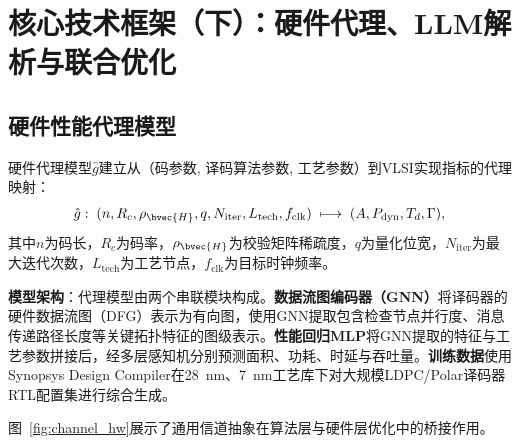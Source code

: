 ﻿\section{核心技术框架（下）：硬件代理、LLM解析与联合优化}\label{sec:framework_b}

\subsection{硬件性能代理模型}\label{sec:hw_proxy}

硬件代理模型$\hat{g}$建立从（码参数, 译码算法参数, 工艺参数）到VLSI实现指标的代理映射：
\begin{equation}
  \hat{g}:\;(n, R_c, \rho_{\bvec{H}}, q, N_{\mathrm{iter}}, L_{\mathrm{tech}}, f_{\mathrm{clk}})
  \;\longmapsto\;(A, P_{\mathrm{dyn}}, T_d, \Gamma),
  \label{eq:hw_proxy}
\end{equation}
其中$n$为码长，$R_c$为码率，$\rho_{\bvec{H}}$为校验矩阵稀疏度，$q$为量化位宽，$N_{\mathrm{iter}}$为最大迭代次数，$L_{\mathrm{tech}}$为工艺节点，$f_{\mathrm{clk}}$为目标时钟频率。

\textbf{模型架构}：代理模型由两个串联模块构成。\textbf{数据流图编码器（GNN）}将译码器的硬件数据流图（DFG）表示为有向图，使用GNN提取包含检查节点并行度、消息传递路径长度等关键拓扑特征的图级表示。\textbf{性能回归MLP}将GNN提取的特征与工艺参数拼接后，经多层感知机分别预测面积、功耗、时延与吞吐量。\textbf{训练数据}使用Synopsys Design Compiler在28~nm、7~nm工艺库下对大规模LDPC/Polar译码器RTL配置集进行综合生成。

图~\ref{fig:channel_hw}展示了通用信道抽象在算法层与硬件层优化中的桥接作用。

